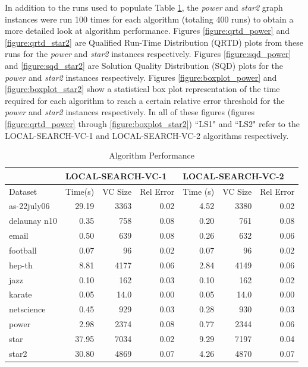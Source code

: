 \documentclass[sigconf]{acmart}
\begin{document}
In addition to the runs used to populate Table \ref{table:algperf}, the \textit{power} and \textit{star2} graph instances were run 100 times for each algorithm (totaling 400 runs) to obtain a more detailed look at algorithm performance. Figures \ref{figure:qrtd_power} and \ref{figure:qrtd_star2} are Qualified Run-Time Distribution (QRTD) plots from these runs for the \textit{power} and \textit{star2} instances respectively. Figures \ref{figure:sqd_power} and \ref{figure:sqd_star2} are Solution Quality Distribution (SQD) plots for the \textit{power} and \textit{star2} instances respectively. Figures \ref{figure:boxplot_power} and \ref{figure:boxplot_star2} show a statistical box plot representation of the time required for each algorithm to reach a certain relative error threshold for the \textit{power} and \textit{star2} instances respectively. In all of these figures (figures \ref{figure:qrtd_power} through \ref{figure:boxplot_star2}) ``LS1" and ``LS2" refer to the LOCAL-SEARCH-VC-1 and LOCAL-SEARCH-VC-2 algorithms respectively.

\begin{table}[h]
	\caption{Algorithm Performance}
	\label{table:algperf}
	\begin{tabular}{lrrrrrr}
		\toprule
		& \multicolumn{3}{l}{LOCAL-SEARCH-VC-1} & \multicolumn{3}{l}{LOCAL-SEARCH-VC-2} \\ \midrule
		Dataset & Time(s)    & VC Size   & Rel Error  & Time (s)   & VC Size   & Rel Error  \\ \midrule
		as-22july06    & 29.19   & 3363      & 0.02   & 4.52   & 3380      & 0.02   \\
		delaunay n10    & 0.35   & 758      & 0.08   & 0.20   & 761      & 0.08   \\
		email    & 0.50   & 639      & 0.08   & 0.26   & 632      & 0.06   \\
		football    & 0.07   & 96      & 0.02   & 0.07   & 96      & 0.02   \\
		hep-th    & 8.81   & 4177      & 0.06   & 2.84   & 4149      & 0.06   \\
		jazz    & 0.10   & 162      & 0.03   & 0.10   & 162      & 0.02   \\
		karate    & 0.05   & 14.0      & 0.00   & 0.05   & 14.0      & 0.00   \\
		netscience    & 0.45   & 929      & 0.03   & 0.28   & 930      & 0.03   \\
		power    & 2.98   & 2374      & 0.08   & 0.77   & 2344      & 0.06   \\
		star    & 37.95   & 7034      & 0.02   & 9.29   & 7197      & 0.04   \\
		star2    & 30.80   & 4869      & 0.07   & 4.26   & 4870      & 0.07   \\
		\bottomrule
	\end{tabular}
\end{table}
\end{document}
